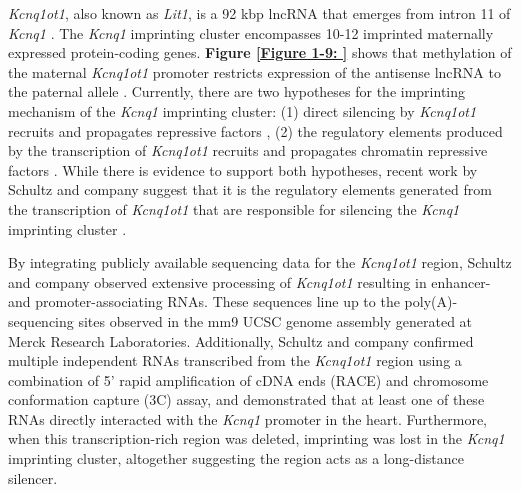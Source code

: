 {\textit{Kcnq1ot1}, also known as \textit{Lit1}, is a 92 kbp lncRNA that emerges from intron 11 of \textit{Kcnq1} \cite{Lee1997,Smilinich1999}. The \textit{Kcnq1} imprinting cluster encompasses 10-12 imprinted maternally expressed protein-coding genes. \textbf{Figure \ref{Figure 1-9: }} shows that methylation of the maternal \textit{Kcnq1ot1} promoter restricts expression of the antisense lncRNA to the paternal allele \cite{Mancini-Dinardo2006}. Currently, there are two hypotheses for the imprinting mechanism of the \textit{Kcnq1} imprinting cluster: (1) direct silencing by \textit{Kcnq1ot1} recruits and propagates repressive factors \cite{Thakur2004}, (2) the regulatory elements produced by the transcription of \textit{Kcnq1ot1} recruits and propagates chromatin repressive factors \cite{Golding2011,Shin2008}. While there is evidence to support both hypotheses, recent work by Schultz and company suggest that it is the regulatory elements generated from the transcription of \textit{Kcnq1ot1} that are responsible for silencing the \textit{Kcnq1} imprinting cluster \cite{Schultz2015}.

By integrating publicly available sequencing data for the \textit{Kcnq1ot1} region, Schultz and company observed extensive processing of \textit{Kcnq1ot1} resulting in enhancer- and promoter-associating RNAs. These sequences line up to the poly(A)-sequencing sites observed in the mm9 UCSC genome assembly \cite{Kent2002} generated at Merck Research Laboratories. Additionally, Schultz and company confirmed multiple independent RNAs transcribed from the \textit{Kcnq1ot1} region using a combination of 5’ rapid amplification of cDNA ends (RACE) and chromosome conformation capture (3C) assay, and demonstrated that at least one of these RNAs directly interacted with the \textit{Kcnq1} promoter in the heart. Furthermore, when this transcription-rich region was deleted, imprinting was lost in the \textit{Kcnq1} imprinting cluster, altogether suggesting the region acts as a long-distance silencer.

}
